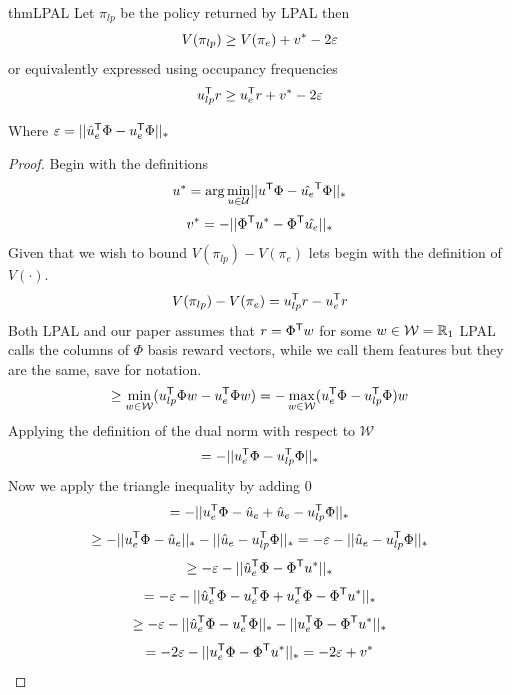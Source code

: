 \documentclass[10pt]{article}
\begin{document}
\begin{restatable}{thm}{LPAL}
\label{thm:LPAL}
	Let $\pi_{lp}$ be the policy returned by LPAL then
	\[V(\pi_{lp}) \geq V(\pi_e) + v^* - 2\varepsilon\]
	or equivalently expressed using occupancy frequencies
	\[u_{lp}^{\mathsf{T}} r \geq u_e^{\mathsf{T}} r + v^* - 2\varepsilon\]

	Where $\varepsilon = \lvert\lvert \hat{u}_e^{\mathsf{T}} \Phi - u_e^{\mathsf{T}} \Phi\rvert\rvert_*$
\end{restatable}
\begin{proof}
	Begin with the definitions
	\[
		u^* = \arg\min_{u \in \mathcal{U}} \lvert\lvert u^{\mathsf{T}} \Phi - \hat{u_e}^{\mathsf{T}} \Phi \rvert\rvert_*
	\]
	\[
		v^* = - \lvert\lvert \Phi^{\mathsf{T}} u^* - \Phi^{\mathsf{T}} \hat{u_e} \rvert\rvert_*
	\]
	Given that we wish to bound $V(\pi_{lp}) - V(\pi_e)$ lets begin with the definition of $V(\cdot)$.
	\[V(\pi_{lp}) - V(\pi_e) = u_{lp}^{\mathsf{T}} r - u_e^{\mathsf{T}} r\]
	Both LPAL and our paper assumes that $r = \Phi^{\mathsf{T}} w$ for some $w \in \mathcal{W} = \mathbb{R}_{1}$ LPAL calls the columns of $\Phi$ basis
	reward vectors, while we call them features but they are the same, save for notation.
	\[\geq \min_{w \in \mathcal{W}}(u_{lp}^{\mathsf{T}} \Phi w - u_e^{\mathsf{T}} \Phi w) =- \max_{w \in \mathcal{W}}(u_e^{\mathsf{T}} \Phi - u_{lp}^{\mathsf{T}} \Phi)w \]
	Applying the definition of the dual norm with respect to $\mathcal{W}$
	\[= -\lvert\lvert u_e^{\mathsf{T}} \Phi - u_{lp}^{\mathsf{T}} \Phi \rvert\rvert_*\]
	Now we apply the triangle inequality by adding 0
	\[= -\lvert\lvert u_e^{\mathsf{T}} \Phi - \hat{u}_e + \hat{u}_e - u_{lp}^{\mathsf{T}} \Phi \rvert\rvert_*\]
	\[\geq -\lvert\lvert u_e^{\mathsf{T}} \Phi - \hat{u}_e\rvert\rvert_* - \lvert\lvert \hat{u}_e - u_{lp}^{\mathsf{T}} \Phi \rvert\rvert_* = -\varepsilon - \lvert\lvert \hat{u}_e - u_{lp}^{\mathsf{T}} \Phi \rvert\rvert_* \]
	\[\geq -\varepsilon - \lvert\lvert \hat{u}_e^{\mathsf{T}} \Phi - \Phi^{\mathsf{T}} u^*\rvert\rvert_*\]
	\[= -\varepsilon - \lvert\lvert \hat{u}_e^{\mathsf{T}} \Phi - u_e^{\mathsf{T}}\Phi + u_e^{\mathsf{T}}\Phi - \Phi^{\mathsf{T}} u^*\rvert\rvert_*\]
	\[\geq -\varepsilon - \lvert\lvert \hat{u}_e^{\mathsf{T}} \Phi - u_e^{\mathsf{T}}\Phi\rvert\rvert_* - \lvert\lvert u_e^{\mathsf{T}}\Phi - \Phi^{\mathsf{T}} u^*\rvert\rvert_*\]
	\[= -2\varepsilon - \lvert\lvert u_e^{\mathsf{T}}\Phi - \Phi^{\mathsf{T}} u^*\rvert\rvert_* = -2\varepsilon + v^*\]
\end{proof}
\end{document}
